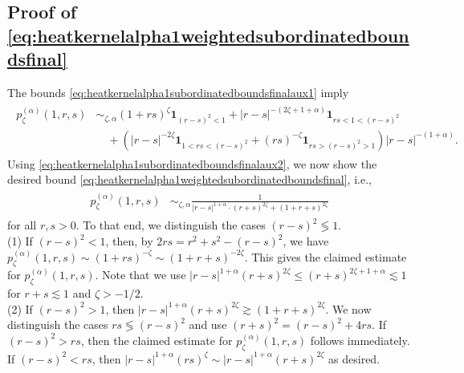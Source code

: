 \documentclass[12pt,reqno,a4paper]{amsart}
\theoremstyle{definition}
\theoremstyle{remark}
\numberwithin{equation}{section}
\newcommand{\1}{\mathbbm{1}}
\newcommand{\one}{\mathbf{1}}
\begin{document}
\subsection{Proof of \eqref{eq:heatkernelalpha1weightedsubordinatedboundsfinal}}\label{A.2}

The bounds \eqref{eq:heatkernelalpha1subordinatedboundsfinalaux1} imply
\begin{align}
  \begin{split}
    \label{eq:heatkernelalpha1subordinatedboundsfinalaux2}
    p_\zeta^{(\alpha)}(1,r,s)
    & \sim_{\zeta,\alpha} \left(1+rs\right)^{\zeta}\one_{(r-s)^2<1} + |r-s|^{-(2\zeta+1+\alpha)}\one_{rs<1<(r-s)^2} \\
    & \quad + \left(|r-s|^{-2\zeta}\one_{1<rs<(r-s)^2}+ (rs)^{-\zeta}\one_{rs>(r-s)^2>1}\right)|r-s|^{-(1+\alpha)}.
  \end{split}
\end{align}
Using \eqref{eq:heatkernelalpha1subordinatedboundsfinalaux2}, we now show the desired bound \eqref{eq:heatkernelalpha1weightedsubordinatedboundsfinal}, i.e.,
\begin{align*}
  \begin{split}
    \label{eq:heatkernelalpha1subordinatedboundsfinal}
    p_\zeta^{(\alpha)}(1,r,s)
    & \sim_{\zeta,\alpha} \frac{1}{|r-s|^{1+\alpha}\cdot(r+s)^{2\zeta} + (1+r+s)^{2\zeta}}
  \end{split}
\end{align*}
for all $r,s>0$. To that end, we distinguish the cases $(r-s)^2\lessgtr1$.
\smallskip\\
(1) If $(r-s)^2<1$, then, by $2rs=r^2+s^2-(r-s)^2$, we have $p_\zeta^{(\alpha)}(1,r,s)\sim (1+rs)^{-\zeta}\sim(1+r+s)^{-2\zeta}$. This gives the claimed estimate for $p_\zeta^{(\alpha)}(1,r,s)$. Note that we use $|r-s|^{1+\alpha}(r+s)^{2\zeta}\leq(r+s)^{2\zeta+1+\alpha}\lesssim1$ for $r+s\lesssim1$ and $\zeta>-1/2$.
\\
(2) If $(r-s)^2>1$, then $|r-s|^{1+\alpha}(r+s)^{2\zeta}\gtrsim(1+r+s)^{2\zeta}$. We now distinguish the cases $rs\lessgtr(r-s)^2$ and use $(r+s)^2=(r-s)^2+4rs$. If $(r-s)^2>rs$, then the claimed estimate for $p_\zeta^{(\alpha)}(1,r,s)$ follows immediately. If $(r-s)^2<rs$, then $|r-s|^{1+\alpha}(rs)^{\zeta} \sim |r-s|^{1+\alpha}(r+s)^{2\zeta}$ as desired.




 
\end{document}
